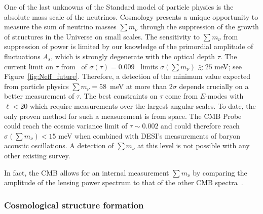 One of the last unknowns of the Standard model of particle physics is the absolute mass scale of the neutrinos.  
Cosmology presents a unique opportunity to measure the sum of neutrino masses $\sum m_\nu$ through the 
suppression of the growth of structures in the Universe on small scales.  
The sensitivity to $\sum m_\nu$ from suppression of power is limited by our knowledge of 
the primordial amplitude of fluctuations $A_s$, which is strongly degenerate with the optical depth $\tau$.  
The current limit on $\tau$ from \planck\ of $\sigma({\tau}) = 0.009$~\cite{} limits 
$\sigma(\sum m_\nu) \gtrsim 25$ meV; see Figure~\ref{fig:Neff_future}.  
Therefore, a detection of the minimum value expected from particle physics  
$\sum m_\nu = 58$~meV at more than $2 \sigma$ depends crucially on a better measurement of $\tau$.  
The best constraints on $\tau$ come from $E$-modes with $\ell < 20$ which require 
measurements over the largest angular scales.
To date, the only proven method for such a measurement is from space.  
The \ac{CMB} Probe could reach the cosmic variance limit of $\tau \sim 0.002$ and could therefore 
reach $\sigma(\sum m_\nu) < 15$ meV when combined with DESI's measurements of 
baryon acoustic oscillations.  
A detection of $\sum m_\nu$ at this level is not possible with any other existing survey.

In fact, the CMB allows for an internal 
measurement $\sum m_\nu$ by comparing the amplitude of the lensing power spectrum to that of the other 
CMB spectra~\cite{Kaplinghat:2003bh}.



\vspace{-0.15in}

\subsubsection{Cosmological structure formation}

